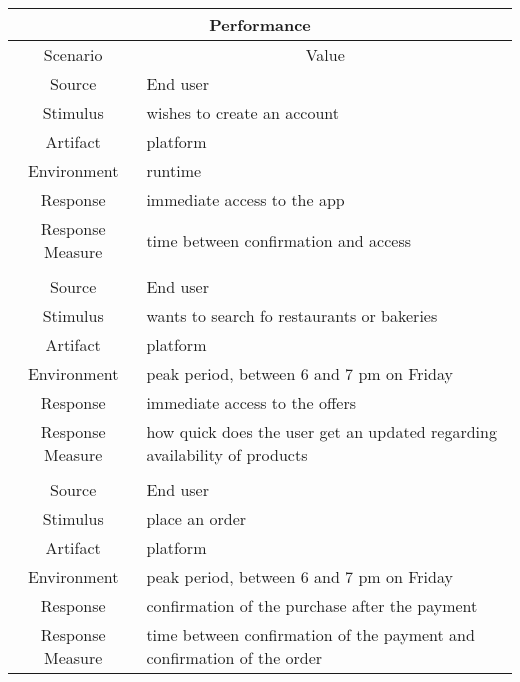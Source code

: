 \begin{table}[H]
    \begin{tabularx}{\textwidth}{|c|X|}
        \hline
        \multicolumn{2}{c}{\textbf{Performance}} \\
        \hline
        \toprule
        \multicolumn{1}{c}{Scenario} & \multicolumn{1}{c}{Value} \\
        \midrule
        Source & End user \\
        Stimulus & wishes to create an account \\
        Artifact & platform \\
        Environment & runtime \\
        Response & immediate access to the app \\
        Response Measure & time between confirmation and access \\
         & \\
        Source & End user \\
        Stimulus & wants to search fo restaurants or bakeries \\
        Artifact & platform \\
        Environment & peak period, between 6 and 7 pm on Friday \\
        Response & immediate access to the offers \\
        Response Measure & how quick does the user get an updated regarding availability of products \\
        & \\
        Source & End user \\
        Stimulus & place an order \\
        Artifact & platform \\
        Environment & peak period, between 6 and 7 pm on Friday \\
        Response & confirmation of the purchase after the payment \\
        Response Measure & time between confirmation of the payment and confirmation of the order \\
        \bottomrule
    \end{tabularx}
\end{table}

